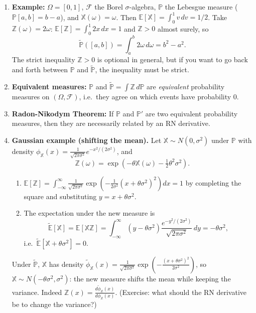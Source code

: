 \begin{enumerate}
    \item \textbf{Example:} $\Omega = [0, 1]$, $\mathcal{F}$ the Borel $\sigma$-algebra, $\mathbb{P}$ the Lebesgue measure ($\mathbb{P}[a, b] = b - a$), and $\mathbb{X}(\omega) = \omega$. Then $\mathbb{E}[\mathbb{X}] = \int_0^1 v\, dv = 1/2$. Take $\mathbb{Z}(\omega) = 2\omega$: $\mathbb{E}[\mathbb{Z}] = \int_0^1 2x\, dx = 1$ and $\mathbb{Z} > 0$ almost surely, so
    \[\tilde{\mathbb{P}}([a, b]) = \int_a^b 2\omega\, d\omega = b^2 - a^2.\]
    The strict inequality $\mathbb{Z} > 0$ is optional in general, but if you want to go back and forth between $\mathbb{P}$ and $\tilde{\mathbb{P}}$, the inequality must be strict.

    \item \textbf{Equivalent measures:} $\mathbb{P}$ and $\tilde{\mathbb{P}} = \int\mathbb{Z}\, d\mathbb{P}$ are \textit{equivalent} probability measures on $(\Omega, \mathcal{F})$, i.e.\ they agree on which events have probability $0$.

    \item \textbf{Radon-Nikodym Theorem:} If $\mathbb{P}$ and $\mathbb{P}'$ are two equivalent probability measures, then they are necessarily related by an RN derivative.

    \item \textbf{Gaussian example (shifting the mean).} Let $\mathbb{X} \sim N(0, \sigma^2)$ under $\mathbb{P}$ with density $\phi_{\mathbb{X}}(x) = \frac{1}{\sqrt{2\pi\sigma^2}}e^{-x^2/(2\sigma^2)}$, and
    \[\mathbb{Z}(\omega) = \exp\!\left(-\theta\mathbb{X}(\omega) - \tfrac{1}{2}\theta^2\sigma^2\right).\]
    \begin{enumerate}
        \item $\mathbb{E}[\mathbb{Z}] = \int_{-\infty}^\infty\frac{1}{\sqrt{2\pi\sigma^2}}\exp\!\left(-\tfrac{1}{2\sigma^2}(x + \theta\sigma^2)^2\right)dx = 1$ by completing the square and substituting $y = x + \theta\sigma^2$.
        \item The expectation under the new measure is
        \[\tilde{\mathbb{E}}[\mathbb{X}] = \mathbb{E}[\mathbb{X}\mathbb{Z}] = \int_{-\infty}^\infty(y - \theta\sigma^2)\frac{e^{-y^2/(2\sigma^2)}}{\sqrt{2\pi\sigma^2}}\,dy = -\theta\sigma^2,\]
        i.e.\ $\tilde{\mathbb{E}}[\mathbb{X} + \theta\sigma^2] = 0$.
    \end{enumerate}
    Under $\tilde{\mathbb{P}}$, $\mathbb{X}$ has density $\tilde{\phi}_{\mathbb{X}}(x) = \frac{1}{\sqrt{2\pi\sigma^2}}\exp\!\left(-\frac{(x + \theta\sigma^2)^2}{2\sigma^2}\right)$, so $\mathbb{X} \sim N(-\theta\sigma^2, \sigma^2)$: the new measure shifts the mean while keeping the variance. Indeed $\mathbb{Z}(x) = \frac{d\tilde{\phi}_{\mathbb{X}}(x)}{d\phi_{\mathbb{X}}(x)}$. (Exercise: what should the RN derivative be to change the variance?)


\end{enumerate}
